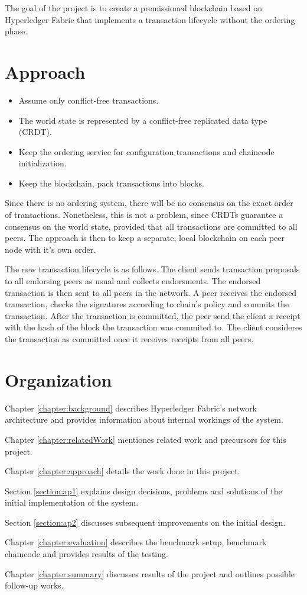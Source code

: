 The goal of the project is to create a premissioned blockchain based on Hyperledger Fabric that implements a transaction lifecycle without the ordering phase.

\section{Approach}
 \label{sec:approach}

\begin{itemize}
  \item Assume only conflict-free transactions.
  \item The world state is represented by a conflict-free replicated data type (CRDT).
  \item Keep the ordering service for configuration transactions and chaincode initialization.
  \item Keep the blockchain, pack transactions into blocks.
\end{itemize}

 Since there is no ordering system, there will be no consensus on the exact order of transactions. Nonetheless, this is not a problem, since CRDTs guarantee a consensus on the world state, provided that all transactions are committed to all peers. The approach is then to keep a separate, local blockchain on each peer node with it's own order.

 The new transaction lifecycle is as follows.
 The client sends transaction proposals to all endorsing peers as usual and collects endorsments. The endorsed transaction is then sent to all peers in the network. A peer receives the endorsed transaction, checks the signatures according to chain's policy and commits the transaction. After the transaction is committed, the peer send the client a receipt with the hash of the block the transaction was commited to. The client consideres the transaction as committed once it receives receipts from all peers.

\section{Organization}
 \label{sec:organization}
 Chapter \ref{chapter:background} describes Hyperledger Fabric's network architecture and provides information about internal workings of the system.

 Chapter \ref{chapter:relatedWork} mentiones related work and precursors for this project.

 Chapter \ref{chapter:approach} details the work done in this project.

 \setlength{\parindent}{1em}
 \indent Section \ref{section:ap1} explains design decisions, problems and solutions of the initial implementation of the system.

 \indent Section \ref{section:ap2} discusses subsequent improvements on the initial design.
 \setlength{\parindent}{0pt}

 Chapter \ref{chapter:evaluation} describes the benchmark setup, benchmark chaincode and provides results of the testing.

 Chapter \ref{chapter:summary} discusses results of the project and outlines possible follow-up works.
